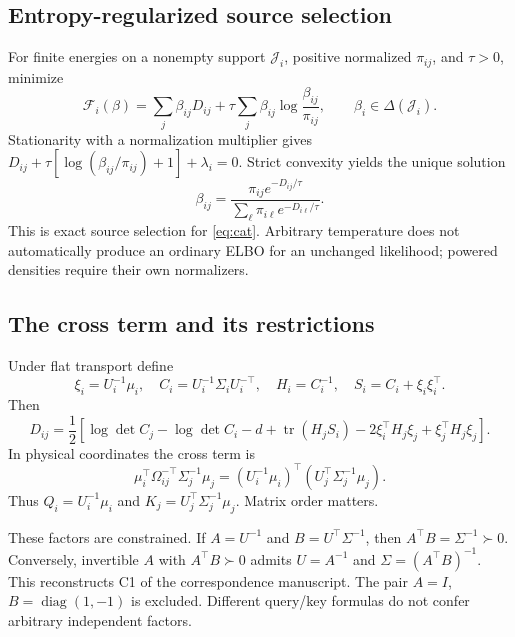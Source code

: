\documentclass[11pt,letterpaper]{article}
\newcommand{\tr}{\operatorname{tr}}
\newcommand{\diag}{\operatorname{diag}}
\theoremstyle{remark}
\begin{document}
\subsection{Entropy-regularized source selection}
For finite energies on a nonempty support $\mathcal J_i$, positive normalized $\pi_{ij}$, and $\tau>0$, minimize
\begin{equation}
 \mathcal F_i(\beta)=\sum_j\beta_{ij}D_{ij}
 +\tau\sum_j\beta_{ij}\log\frac{\beta_{ij}}{\pi_{ij}},
 \qquad \beta_i\in\Delta(\mathcal J_i).
 \label{eq:cat}
\end{equation}
Stationarity with a normalization multiplier gives
$D_{ij}+\tau[\log(\beta_{ij}/\pi_{ij})+1]+\lambda_i=0$.
Strict convexity yields the unique solution
\begin{equation}
 \boxed{\beta_{ij}=\frac{\pi_{ij}e^{-D_{ij}/\tau}}
 {\sum_\ell\pi_{i\ell}e^{-D_{i\ell}/\tau}}.}
 \label{eq:softmax}
\end{equation}
This is exact source selection for \eqref{eq:cat}. Arbitrary temperature does not automatically produce an ordinary ELBO for an unchanged likelihood; powered densities require their own normalizers.

\subsection{The cross term and its restrictions}
Under flat transport define
\begin{equation}
 \xi_i=U_i^{-1}\mu_i,\quad C_i=U_i^{-1}\Sigma_iU_i^{-\top},\quad
 H_i=C_i^{-1},\quad S_i=C_i+\xi_i\xi_i^\top.
\end{equation}
Then
\begin{equation}
 D_{ij}=\frac12\left[
 \log\det C_j-\log\det C_i-d+\tr(H_jS_i)
 -2\xi_i^\top H_j\xi_j+\xi_j^\top H_j\xi_j\right].
 \label{eq:canonical-kl}
\end{equation}
In physical coordinates the cross term is
\begin{equation}
 \boxed{\mu_i^\top\Omega_{ij}^{-\top}\Sigma_j^{-1}\mu_j
 =(U_i^{-1}\mu_i)^\top(U_j^\top\Sigma_j^{-1}\mu_j).}
 \label{eq:qk}
\end{equation}
Thus $Q_i=U_i^{-1}\mu_i$ and $K_j=U_j^\top\Sigma_j^{-1}\mu_j$. Matrix order matters.

These factors are constrained. If $A=U^{-1}$ and $B=U^\top\Sigma^{-1}$, then $A^\top B=\Sigma^{-1}\succ0$. Conversely, invertible $A$ with $A^\top B\succ0$ admits $U=A^{-1}$ and $\Sigma=(A^\top B)^{-1}$. This reconstructs C1 of the correspondence manuscript. The pair $A=I$, $B=\diag(1,-1)$ is excluded. Different query/key formulas do not confer arbitrary independent factors.
\end{document}
